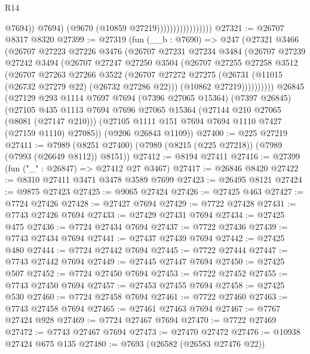 \begin{lexlean}{R14}
\begin{coremodule}
                                        @7694))
                                    @7694)
                                  (@9670 (@10859 @27219)))))))))))))))))
@27321 := @26707 @8317 @8320
@27399 := @27319
    (fun (__b : @7690) =>
    @247
      (@27321
        @3466
        (@26707
          @27223
          @27226
          @3476
          (@26707
            @27231
            @27234
            @3484
            (@26707
              @27239
              @27242
              @3494
              (@26707
                @27247
                @27250
                @3504
                (@26707
                  @27255
                  @27258
                  @3512
                  (@26707
                    @27263
                    @27266
                    @3522
                    (@26707
                      @27272
                      @27275
                      (@26731 (@11015 (@26732 @27279 @22) (@26732 @27286 @22)))
                      (@10862 @27219))))))))))
    @26845
    (@27129
      @293
      @1114
      @7697
      @7694
      (@7396 @27065 @15364)
      (@7397 @26845)
      (@27105
        @435
        @1113
        @7694
        @7696
        @27065
        @15364
        (@27144 @210 @27065 (@8081 (@27147 @210)))
        (@27105 @1111 @151 @7694 @7694 @1110 @7427 (@27159 @1110) @27085))
      (@9206 @26843 @1109))
@27400 := @225 @27219
@27411 := @7989 (@8251 @27400) (@7989 (@8215 (@225 @27218)) (@7989 (@7993 (@26649 @8112)) @8151))
@27412 := @8194 @27411
@27416 := @27399 (fun ("_" : @26847) => @27412 @27 @3467)
@27417 := @26846 @8420
@27422 := @8310 @27411 @3471 @3478 @3589 @7699
@27423 := @26495 @8121
@27424 := @9875 @27423
@27425 := @9065 @27424
@27426 := @27425 @463
@27427 := @7724 @27426
@27428 := @27427 @7694
@27429 := @7722 @27428
@27431 := @7743 @27426 @7694
@27433 := @27429 @27431 @7694
@27434 := @27425 @475
@27436 := @7724 @27434 @7694
@27437 := @7722 @27436
@27439 := @7743 @27434 @7694
@27441 := @27437 @27439 @7694
@27442 := @27425 @480
@27444 := @7724 @27442 @7694
@27445 := @7722 @27444
@27447 := @7743 @27442 @7694
@27449 := @27445 @27447 @7694
@27450 := @27425 @507
@27452 := @7724 @27450 @7694
@27453 := @7722 @27452
@27455 := @7743 @27450 @7694
@27457 := @27453 @27455 @7694
@27458 := @27425 @530
@27460 := @7724 @27458 @7694
@27461 := @7722 @27460
@27463 := @7743 @27458 @7694
@27465 := @27461 @27463 @7694
@27467 := @7767 @27424 @928
@27469 := @7724 @27467 @7694
@27470 := @7722 @27469
@27472 := @7743 @27467 @7694
@27473 := @27470 @27472
@27476 := @10938 @27424 @675 @135
@27480 := @7693 (@26582 (@26583 @27476 @22))

\end{coremodule}
\end{lexlean}
